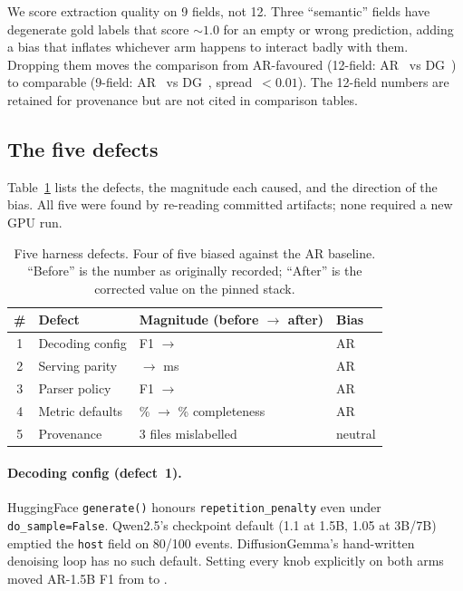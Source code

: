 We score extraction quality on 9 fields, not 12. Three ``semantic'' fields
have degenerate gold labels that score $\sim\!1.0$ for an empty or wrong
prediction, adding a bias that inflates whichever arm happens to interact
badly with them. Dropping them moves the comparison from AR-favoured
(12-field: AR~\arThreeBFtwelve{} vs DG~\dgTwelveF{}) to comparable (9-field:
AR~\arThreeBFnine{} vs DG~\dgNineF{}, spread~$<\!0.01$). The 12-field numbers
are retained for provenance but are not cited in comparison tables.

\subsection{The five defects}

Table~\ref{tab:defects} lists the defects, the magnitude each caused, and the
direction of the bias. All five were found by re-reading committed artifacts;
none required a new GPU run.

\begin{table}[t]
\centering
\caption{Five harness defects. Four of five biased against the AR baseline.
``Before'' is the number as originally recorded; ``After'' is the corrected
value on the pinned stack.}
\label{tab:defects}
\begin{tabular}{clll}
\toprule
\# & Defect & Magnitude (before $\to$ after) & Bias \\
\midrule
1 & Decoding config       & F1 {} $\to$ {}                        & AR \\
2 & Serving parity        & {} $\to$ {} ms                         & AR \\
3 & Parser policy         & F1 {} $\to$ {}                     & AR \\
4 & Metric defaults       & \% $\to$ \% completeness            & AR \\
5 & Provenance            & 3 files mislabelled                                                   & neutral \\
\bottomrule
\end{tabular}
\end{table}

\paragraph{Decoding config (defect~1).}
HuggingFace \texttt{generate()} honours \texttt{repetition\_penalty} even under
\texttt{do\_sample=False}. Qwen2.5's checkpoint default (1.1 at 1.5B, 1.05 at
3B/7B) emptied the \texttt{host} field on 80/100 events. DiffusionGemma's
hand-written denoising loop has no such default. Setting every knob explicitly
on both arms moved AR-1.5B F1 from  to .

